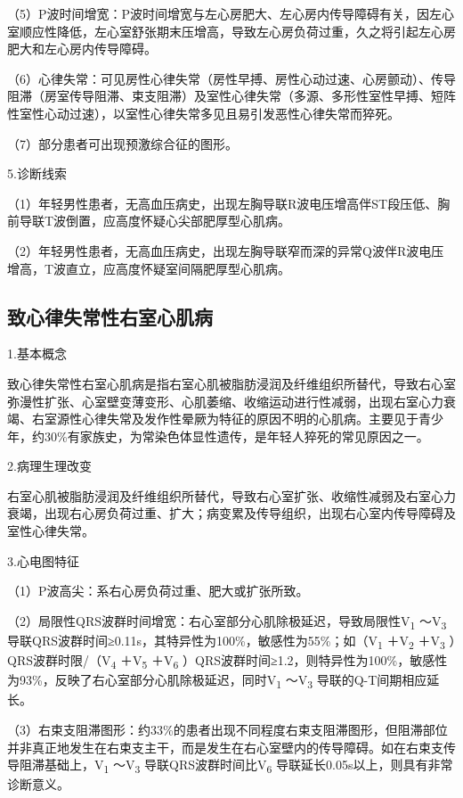 （5）P波时间增宽：P波时间增宽与左心房肥大、左心房内传导障碍有关，因左心室顺应性降低，左心室舒张期末压增高，导致左心房负荷过重，久之将引起左心房肥大和左心房内传导障碍。

（6）心律失常：可见房性心律失常（房性早搏、房性心动过速、心房颤动）、传导阻滞（房室传导阻滞、束支阻滞）及室性心律失常（多源、多形性室性早搏、短阵性室性心动过速），以室性心律失常多见且易引发恶性心律失常而猝死。

（7）部分患者可出现预激综合征的图形。

5.诊断线索

（1）年轻男性患者，无高血压病史，出现左胸导联R波电压增高伴ST段压低、胸前导联T波倒置，应高度怀疑心尖部肥厚型心肌病。

（2）年轻男性患者，无高血压病史，出现左胸导联窄而深的异常Q波伴R波电压增高，T波直立，应高度怀疑室间隔肥厚型心肌病。

\protect\hypertarget{text00051.htmlux5cux23subid617}{}{}

\subsection{致心律失常性右室心肌病}

1.基本概念

致心律失常性右室心肌病是指右室心肌被脂肪浸润及纤维组织所替代，导致右心室弥漫性扩张、心室壁变薄变形、心肌萎缩、收缩运动进行性减弱，出现右室心力衰竭、右室源性心律失常及发作性晕厥为特征的原因不明的心肌病。主要见于青少年，约30\%有家族史，为常染色体显性遗传，是年轻人猝死的常见原因之一。

2.病理生理改变

右室心肌被脂肪浸润及纤维组织所替代，导致右心室扩张、收缩性减弱及右室心力衰竭，出现右心房负荷过重、扩大；病变累及传导组织，出现右心室内传导障碍及室性心律失常。

3.心电图特征

（1）P波高尖：系右心房负荷过重、肥大或扩张所致。

（2）局限性QRS波群时间增宽：右心室部分心肌除极延迟，导致局限性V\textsubscript{1}
～V\textsubscript{3}
导联QRS波群时间≥0.11s，其特异性为100\%，敏感性为55\%；如（V\textsubscript{1}
＋V\textsubscript{2} ＋V\textsubscript{3}
）QRS波群时限/（V\textsubscript{4} ＋V\textsubscript{5}
＋V\textsubscript{6}
）QRS波群时间≥1.2，则特异性为100\%，敏感性为93\%，反映了右心室部分心肌除极延迟，同时V\textsubscript{1}
～V\textsubscript{3} 导联的Q-T间期相应延长。

（3）右束支阻滞图形：约33\%的患者出现不同程度右束支阻滞图形，但阻滞部位并非真正地发生在右束支主干，而是发生在右心室壁内的传导障碍。如在右束支传导阻滞基础上，V\textsubscript{1}
～V\textsubscript{3} 导联QRS波群时间比V\textsubscript{6}
导联延长0.05s以上，则具有非常诊断意义。

